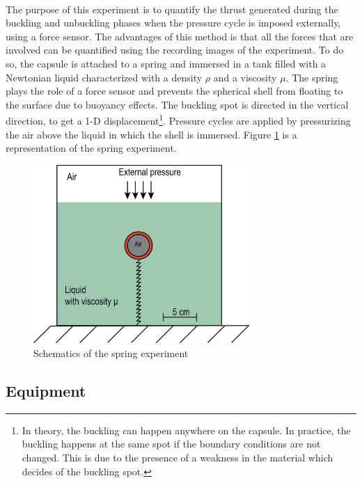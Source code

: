 \paragraph{}
The purpose of this experiment is to quantify the thrust generated during the buckling and unbuckling phases when the pressure cycle is imposed externally, using a force sensor. The advantages of this method is that all the forces that are involved can be quantified using the recording images of the experiment. To do so, the capsule is attached to a spring and immersed in a tank filled with a Newtonian liquid characterized with a density $\rho$ and a viscosity $\mu$. The spring plays the role of a force sensor and prevents the spherical shell from floating to the surface due to buoyancy effects.  The buckling spot is directed in the vertical direction, to get a 1-D displacement\footnote{In theory, the buckling can happen anywhere on the capsule. In practice, the buckling happens at the same spot if the boundary conditions are not changed. This is due to the presence of a weakness in the material which decides of the buckling spot.}. Pressure cycles are applied by pressurizing the air above the liquid in which the shell is immersed. Figure \ref{fig:spring_experiment_schematic} is a representation of the spring experiment.
\begin{figure}[H] %
	\centering%
  \includegraphics[width=0.73\textwidth]{figures/Chapter_1/schematic_experimental_setup.png}
	\caption{Schematics of the spring experiment}
	\label{fig:spring_experiment_schematic}
\end{figure}

\subsection{Equipment}
